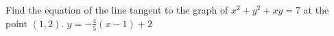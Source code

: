 {Find the equation of the line tangent to the graph of $x^2+y^2+xy=7$ at the point $(1,2)$. 
}
{ $y=-\frac45(x-1)+2$
}
